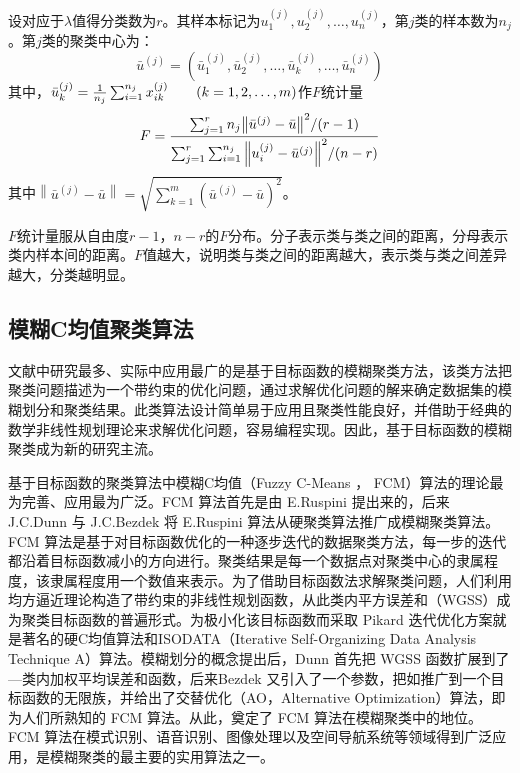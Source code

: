 \begin{enumerate}[label=（\arabic*）]
	设对应于$\lambda$值得分类数为$r$。其样本标记为$u_1^{(j)},u_2^{(j)} , \dots , u_n^{(j)}$，第$j$类的样本数为$n_j$。第$j$类的聚类中心为：
	\begin{equation}
		\bar{u}^{(j)} = (\bar{u}_1^{(j)},\bar{u}_2^{(j)},\dots,\bar{u}_k^{(j)},\dots,\bar{u}_n^{(j)})
	\end{equation}
	其中，$\bar{u}_k^{(j)} = {1\over n_j} \sum_{i=1}^{n_j} x_{ik}^{(j)} \qquad (k=1,2,\dots,m)$作$F$统计量
	\begin{equation}
		F = {\sum_{j=1}^{r} n_j {\left\| {\bar{u}}^{(j)}-\bar{u} \right\| }^2 / (r-1)
			\over 
	\sum_{j=1}^{r} \sum_{i=1}^{n_j}	{\left\| u_i^{(j)}-\bar{u}^{(j)} \right\| }^2/(n-r)	}
	\end{equation}
	其中$\left\| {\bar{u}}^{(j)}-\bar{u} \right\|  = \sqrt{\sum_{k=1}^{m}{({\bar{u}}^{(j)}-\bar{u})}^2}$。
	
	$F$统计量服从自由度$r-1$，$n-r$的$F$分布。分子表示类与类之间的距离，分母表示类内样本间的距离。$F$值越大，说明类与类之间的距离越大，表示类与类之间差异越大，分类越明显。
	
\end{enumerate}

\subsection{模糊C均值聚类算法}
文献中研究最多、实际中应用最广的是基于目标函数的模糊聚类方法，该类方法把聚类问题描述为一个带约束的优化问题，通过求解优化问题的解来确定数据集的模糊划分和聚类结果。此类算法设计简单易于应用且聚类性能良好，并借助于经典的数学非线性规划理论来求解优化问题，容易编程实现。因此，基于目标函数的模糊聚类成为新的研究主流。

基于目标函数的聚类算法中模糊C均值（Fuzzy  C-Means ， FCM）算法的理论最为完善、应用最为广泛。FCM 算法首先是由 E.Ruspini 提出来的，后来 J.C.Dunn 与 J.C.Bezdek 将 E.Ruspini 算法从硬聚类算法推广成模糊聚类算法。FCM 算法是基于对目标函数优化的一种逐步迭代的数据聚类方法，每一步的迭代都沿着目标函数减小的方向进行。聚类结果是每一个数据点对聚类中心的隶属程度，该隶属程度用一个数值来表示。为了借助目标函数法求解聚类问题，人们利用均方逼近理论构造了带约束的非线性规划函数，从此类内平方误差和（WGSS）成为聚类目标函数的普遍形式。为极小化该目标函数而采取 Pikard 迭代优化方案就是著名的硬C均值算法和ISODATA（Iterative Self-Organizing Data Analysis Technique A）算法。模糊划分的概念提出后，Dunn 首先把 WGSS 函数扩展到了—类内加权平均误差和函数，后来Bezdek 又引入了一个参数，把如推广到一个目标函数的无限族，并给出了交替优化（AO，Alternative Optimization）算法，即为人们所熟知的 FCM 算法。从此，奠定了 FCM 算法在模糊聚类中的地位。FCM 算法在模式识别、语音识别、图像处理以及空间导航系统等领域得到广泛应用，是模糊聚类的最主要的实用算法之一。


